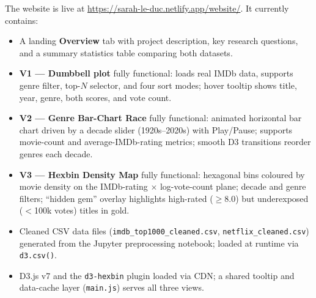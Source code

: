 \documentclass[a4paper,10pt]{article}
\begin{document}
The website is live at \url{https://sarah-le-duc.netlify.app/website/}.
It currently contains:
\begin{itemize}[nosep,leftmargin=*]
  \item A landing \textbf{Overview} tab with project description, key research
        questions, and a summary statistics table comparing both datasets.
  \item \textbf{V1 — Dumbbell plot} fully functional: loads real IMDb data,
        supports genre filter, top-$N$ selector, and four sort modes; hover
        tooltip shows title, year, genre, both scores, and vote count.
  \item \textbf{V2 — Genre Bar-Chart Race} fully functional: animated horizontal
        bar chart driven by a decade slider (1920s--2020s) with Play/Pause; supports
        movie-count and average-IMDb-rating metrics; smooth D3 transitions reorder
        genres each decade.
  \item \textbf{V3 — Hexbin Density Map} fully functional: hexagonal bins coloured
        by movie density on the IMDb-rating $\times$ log-vote-count plane; decade
        and genre filters; ``hidden gem'' overlay highlights high-rated
        (\(\geq 8.0\)) but underexposed (\(<\)100k votes) titles in gold.
  \item Cleaned CSV data files (\texttt{imdb\_top1000\_cleaned.csv},
        \texttt{netflix\_cleaned.csv}) generated from the Jupyter preprocessing
        notebook; loaded at runtime via \texttt{d3.csv()}.
  \item D3.js v7 and the \texttt{d3-hexbin} plugin loaded via CDN; a shared
        tooltip and data-cache layer (\texttt{main.js}) serves all three views.
\end{itemize}
\end{document}
